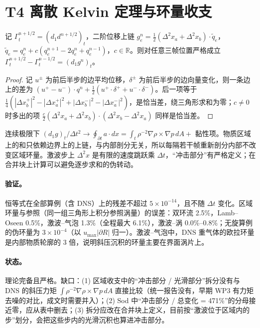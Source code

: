 \section{T4 离散 Kelvin 定理与环量收支}

\begin{theorem}
记 $\Gamma_t^{n+1/2}=(d_1d^{n+1/2})_t$，二阶位移上链 $g_e^n=\tfrac12(\Delta^2x_a+\Delta^2x_b)\cdot\tilde q_e$，$\tilde q_e=q_e^n+c(q_e^{n+1}-2q_e^n+q_e^{n-1})$，$c\in\mathbb R$。则对任意三帧位置严格成立 $\Gamma_t^{n+1/2}-\Gamma_t^{n-1/2}=(d_1g^n)_t$。
\end{theorem}
\begin{proof}
记 $u^\pm$ 为前后半步的边平均位移，$\delta^\pm$ 为前后半步的边向量变化，则一条边上的差为 $(u^+-u^-)\cdot q^n+\tfrac12(u^+\!\cdot\delta^++u^-\!\cdot\delta^-)$。后一项等于 $\tfrac14(|\Delta x_b^+|^2-|\Delta x_a^+|^2+|\Delta x_b^-|^2-|\Delta x_a^-|^2)$，是恰当差，绕三角形求和为零；$c\neq0$ 时多出的项 $\tfrac c2(\Delta^2x_a+\Delta^2x_b)\cdot(\Delta^2x_b-\Delta^2x_a)$ 同样是恰当差。
\end{proof}
连续极限下 $(d_1g)_t/\Delta t^2\to\oint_{\partial t}a\cdot dx=\int_t\rho^{-2}\nabla\rho\times\nabla p\,dA+$ 黏性项。物质区域上的和只依赖边界上的上链，与内部剖分无关，所以每隔若干帧重新剖分内部不改变区域环量。激波步上 $\Delta^2x$ 是有限的速度跳跃乘 $\Delta t$，“冲击部分”有严格定义；在合并块上计算可以避免逐步求和的伪转动。

\paragraph{验证。}恒等式在全部算例（含 DNS）上的残差不超过 $5\times10^{-14}$，且不随 $\Delta t$ 变化。区域环量与参照（同一组三角形上积分参照涡量）的误差：双环流 2.5\%，Lamb–Oseen 0.5\%，激波–气泡 1.3\%（全程最大 6.1\%），激波–涡 0.0\%–0.8\%；无旋算例的伪环量为 $3\times10^{-4}$（以 $u_{\max}|\partial R|$ 归一）。激波–气泡中，DNS 重气体的欧拉环量是内部物质轮廓的 3 倍，说明斜压沉积的环量主要在界面涡片上。

\paragraph{状态。}理论完备且严格。缺口：(1) 区域收支中的“冲击部分 / 光滑部分”拆分没有与 DNS 的斜压力矩 $\int\rho^{-2}\nabla\rho\times\nabla p\,dA$ 直接比较（统一报告没有，早期 WP3 有力矩去噪的对比，成文时需要并入）；(2) Sod 中“冲击部分 / 总变化 = 471\%”的分母接近零，应从表中删去；(3) 拆分应改在合并块上定义，目前按“激波位于区域内的步”划分，会把这些步内的光滑沉积也算进冲击部分。

